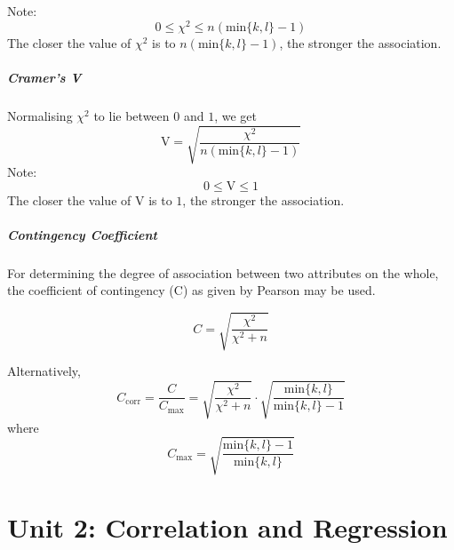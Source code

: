 \documentclass[
10pt, %
a4paper, %
]{report}
\begin{document}
Note:
\[ 0 \le \chi^2 \le n(\mathrm{min}\{k, l\}-1) \]
The closer the value of \(\chi^2\) is to \(n(\mathrm{min}\{k, l\}-1)\), the stronger the association.

\paragraph*{Cramer's V}
Normalising \(\chi^2\) to lie between \(0\) and \(1\), we get
\[
\mathrm{V} = \sqrt{\frac{\chi^2}{n(\mathrm{min}\{k, l\}-1)}}
\]
Note:
\[0 \le \mathrm{V} \le 1\]
The closer the value of V is to \(1\), the stronger the association.

\paragraph*{Contingency Coefficient}
For determining the degree of association between two attributes on the whole, the coefficient of contingency (C) as given by Pearson may be used.

\[
C = \sqrt{\frac{\chi^2}{\chi^2+n}}
\]

Alternatively,
\[
C_\mathrm{corr} = \frac{C}{C_\mathrm{max}} = \sqrt{\frac{\chi^2}{\chi^2+n}} \cdot \sqrt{\frac{\mathrm{min}\{k, l\}}{\mathrm{min}\{k, l\}-1}}
\]
where
\[
C_\mathrm{max} = \sqrt{\frac{\mathrm{min}\{k, l\}-1}{\mathrm{min}\{k, l\}}}
\]

\chapter*{Unit 2: Correlation and Regression}
\end{document}
